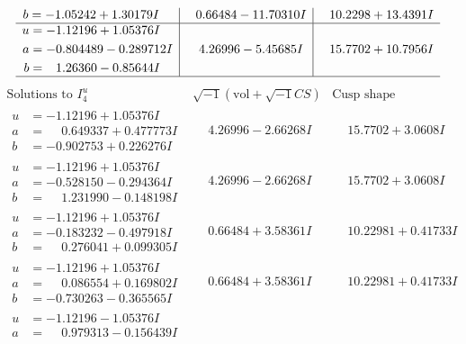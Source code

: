 \documentclass[1p]{elsarticle_modified}
\theoremstyle{definition}
\newcommand{\I}{\sqrt{-1}}
\begin{document}
$$\begin{array}{c|c|c}
\begin{aligned}
b &= -1.05242 + 1.30179 I\end{aligned}
 & \phantom{-}0.66484 - 11.70310 I & \phantom{-}10.2298 + 13.4391 I \\ \hline\begin{aligned}
u &= -1.12196 + 1.05376 I \\
a &= -0.804489 - 0.289712 I \\
b &= \phantom{-}1.26360 - 0.85644 I\end{aligned}
 & \phantom{-}4.26996 - 5.45685 I & \phantom{-}15.7702 + 10.7956 I\\
 \hline 
 \end{array}$$\newpage$$\begin{array}{c|c|c}  
\text{Solutions to }I^u_{4}& \I (\text{vol} + \sqrt{-1}CS) & \text{Cusp shape}\\
 \hline 
\begin{aligned}
u &= -1.12196 + 1.05376 I \\
a &= \phantom{-}0.649337 + 0.477773 I \\
b &= -0.902753 + 0.226276 I\end{aligned}
 & \phantom{-}4.26996 - 2.66268 I & \phantom{-}15.7702 + 3.0608 I \\ \hline\begin{aligned}
u &= -1.12196 + 1.05376 I \\
a &= -0.528150 - 0.294364 I \\
b &= \phantom{-}1.231990 - 0.148198 I\end{aligned}
 & \phantom{-}4.26996 - 2.66268 I & \phantom{-}15.7702 + 3.0608 I \\ \hline\begin{aligned}
u &= -1.12196 + 1.05376 I \\
a &= -0.183232 - 0.497918 I \\
b &= \phantom{-}0.276041 + 0.099305 I\end{aligned}
 & \phantom{-}0.66484 + 3.58361 I & \phantom{-}10.22981 + 0.41733 I \\ \hline\begin{aligned}
u &= -1.12196 + 1.05376 I \\
a &= \phantom{-}0.086554 + 0.169802 I \\
b &= -0.730263 - 0.365565 I\end{aligned}
 & \phantom{-}0.66484 + 3.58361 I & \phantom{-}10.22981 + 0.41733 I \\ \hline\begin{aligned}
u &= -1.12196 - 1.05376 I \\
a &= \phantom{-}0.979313 - 0.156439 I \\

\end{aligned}
\end{array}$$
\end{document}
